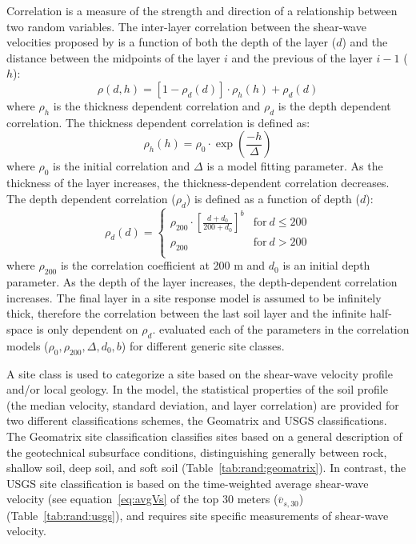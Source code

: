 \documentclass[12pt,oneside]{book}
\begin{document}
Correlation is a measure of the strength and direction of a relationship between two random
variables.  The inter-layer correlation between the shear-wave velocities proposed by
\citet{toro:95} is a function of both the depth of the layer ($d$) and the distance between the
midpoints of the layer $i$ and the previous of the layer $i-1$ ($h$):
\begin{equation}
    \rho(d,h) = \left[1 - \rho_d(d)\right] \cdot \rho_h(h) + \rho_d(d)
\end{equation}
where $\rho_h$ is the thickness dependent correlation and $\rho_d$ is the depth dependent
correlation.  The thickness dependent correlation is defined as:
\begin{equation}
    \rho_h(h) = \rho_0 \cdot \exp\left(\frac{-h}{\Delta}\right)
\end{equation}
where $\rho_0$ is the initial correlation and $\Delta$ is a model fitting parameter.  As the
thickness of the layer increases, the thickness-dependent correlation decreases.  The depth
dependent correlation ($\rho_d$) is defined as a function of depth ($d$): 
\begin{equation}
    \rho_d(d) = 
    \left\{
        \begin{array}{ll}
            \rho_{200} \cdot \left[ \frac{d+d_0}{200+d_0} \right]^b & \mathrm{for}\ d \leq 200 \\
            \rho_{200} & \mathrm{for}\ d > 200 \\
        \end{array}
    \right. 
\end{equation}
where $\rho_{200}$ is the correlation coefficient at 200 m and $d_0$ is an initial depth parameter.
As the depth of the layer increases, the depth-dependent correlation increases.  The final layer in
a site response model is assumed to be infinitely thick, therefore the correlation between the last
soil layer and the infinite half-space is only dependent on $\rho_d$.  \citep{toro:95} evaluated
each of the parameters in the correlation models ($\rho_0, \rho_{200}, \Delta, d_0, b$) for
different generic site classes.

A site class is used to categorize a site based on the shear-wave velocity profile and/or local
geology.  In the \citet{toro:95} model, the statistical properties of the soil profile (the median
velocity, standard deviation, and layer correlation) are provided for two different classifications
schemes, the Geomatrix and USGS classifications. The Geomatrix site classification classifies sites
based on a general description of the geotechnical subsurface conditions, distinguishing generally
between rock, shallow soil, deep soil, and soft soil (Table~\ref{tab:rand:geomatrix}).  In contrast,
the USGS site classification is based on the time-weighted average shear-wave velocity (see
equation~\ref{eq:avgVs} of the top 30 meters ($\overline{v}_{s,30}$) (Table~\ref{tab:rand:usgs}),
and requires site specific measurements of shear-wave velocity.
\end{document}
